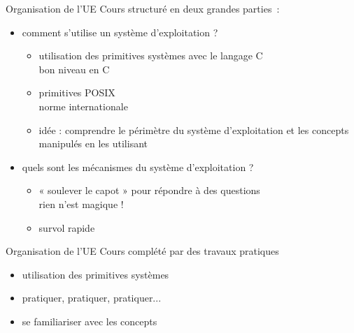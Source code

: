 \def\inc{inc1-intro}




\begin {frame} {Organisation de l'UE}
    Cours structuré en deux grandes parties~:

    \begin {itemize}
	\item comment s'utilise un système d'exploitation ?

	    \begin {itemize}
		\item utilisation des primitives systèmes avec le
		    langage C
		    \\
		    \implique bon niveau en C

		\item primitives POSIX
		    \\
		    \implique norme internationale

		\item idée : comprendre le périmètre du système
		    d'exploitation et les concepts manipulés en
		    les utilisant

	    \end {itemize}

	\item quels sont les mécanismes du système d'exploitation ?

	    \begin {itemize}
		\item « soulever le capot » pour répondre à des
		    questions \\
		    \implique rien n'est magique !

		\item survol rapide
	    \end {itemize}
    \end {itemize}
\end {frame}

\begin {frame} {Organisation de l'UE}
    Cours complété par des travaux pratiques

    \begin {itemize}
	\item utilisation des primitives systèmes
	\item pratiquer, pratiquer, pratiquer...
	\item se familiariser avec les concepts
    \end {itemize}
\end {frame}

